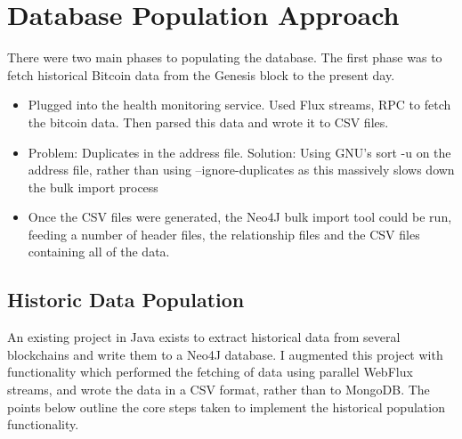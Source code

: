 \section{Database Population Approach}
There were two main phases to populating the database. The first phase was to fetch historical Bitcoin data from the Genesis block to the present day. 
\begin{itemize}
    \item Plugged into the health monitoring service. Used Flux streams, RPC to fetch the bitcoin data. Then parsed this data and wrote it to CSV files. 
    \item Problem: Duplicates in the address file. Solution: Using GNU's sort -u on the address file, rather than using --ignore-duplicates as this massively slows down the bulk import process
    \item Once the CSV files were generated, the Neo4J bulk import tool could be run, feeding a number of header files, the relationship files and the CSV files containing all of the data. 
    
\end{itemize}

\subsection{Historic Data Population}
An existing project in Java exists to extract historical data from several blockchains and write them to a Neo4J database. I augmented this project with functionality which performed the fetching of data using parallel WebFlux streams, and wrote the data in a CSV format, rather than to MongoDB. The points below outline the core steps taken to implement the historical population functionality. 

